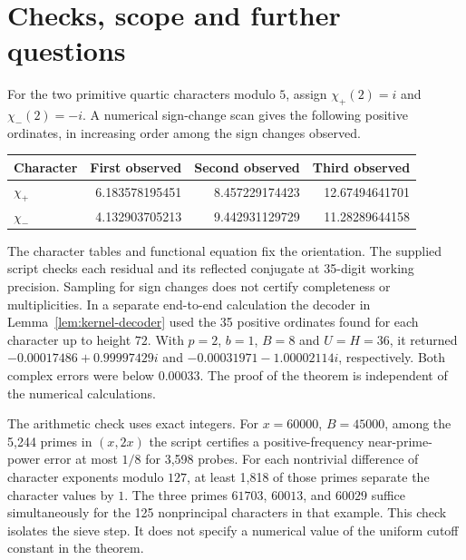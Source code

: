 \documentclass[11pt]{article}
\begin{document}
\section{Checks, scope and further questions}
For the two primitive quartic characters modulo $5$, assign $\chi_+(2)=i$ and
$\chi_-(2)=-i$. A numerical sign-change scan gives the following positive
ordinates, in increasing order among the sign changes observed.
\begin{center}
\begin{tabular}{lrrr}
\toprule
Character & First observed & Second observed & Third observed\\
\midrule
$\chi_+$ & 6.183578195451 & 8.457229174423 & 12.67494641701\\
$\chi_-$ & 4.132903705213 & 9.442931129729 & 11.28289644158\\
\bottomrule
\end{tabular}
\end{center}
The character tables and functional equation fix the orientation. The supplied
script checks each residual and its reflected conjugate at 35-digit working
precision. Sampling for sign changes does not certify completeness or
multiplicities. In a separate end-to-end calculation the decoder in
Lemma~\ref{lem:kernel-decoder} used the 35 positive ordinates found for each
character up to height $72$. With $p=2$, $b=1$, $B=8$ and $U=H=36$, it returned
$-0.00017486+0.99997429i$ and $-0.00031971-1.00002114i$, respectively.
Both complex errors were below $0.00033$. The proof of the theorem is independent of
the numerical calculations.

The arithmetic check uses exact integers. For $x=60000$, $B=45000$, among
the 5,244 primes in $(x,2x)$ the script certifies a positive-frequency
near-prime-power error at most $1/8$ for 3,598 probes. For each nontrivial
difference of character exponents modulo $127$, at least 1,818 of those
primes separate the character values by $1$. The three primes $61703$,
$60013$, and $60029$ suffice simultaneously for the 125 nonprincipal
characters in that example. This check isolates the sieve step. It does
not specify a numerical value of the uniform cutoff constant in the theorem.
\end{document}
